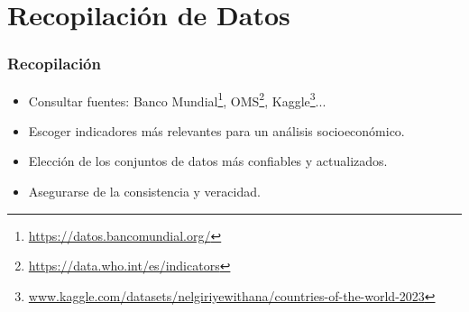 \documentclass{beamer}
\newcommand{\slideauthor}[1]{\gdef\insertslideauthor{#1}}
\begin{document}
\section{Recopilación de Datos}
\begin{frame}
\frametitle{Recopilación}
\slideauthor{Javier Comyn}
\begin{itemize}
    \item Consultar fuentes: Banco Mundial\footnote{\url{https://datos.bancomundial.org/}}, OMS\footnote{\url{https://data.who.int/es/indicators}}, Kaggle\footnote{\url{www.kaggle.com/datasets/nelgiriyewithana/countries-of-the-world-2023}}...
    \item Escoger indicadores más relevantes para un análisis socioeconómico.
    \item Elección de los conjuntos de datos más confiables y actualizados.
    \item Asegurarse de la consistencia y veracidad.
\end{itemize}
\end{frame}
\end{document}

